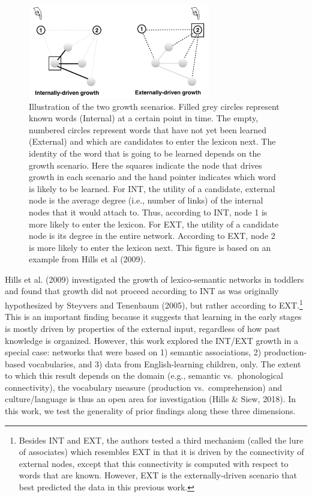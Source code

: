 \documentclass[english,floatsintext,man]{apa6}
\theoremstyle{definition}
\theoremstyle{definition}
\theoremstyle{definition}
\theoremstyle{remark}
\begin{document}
\begin{figure}

{\centering \includegraphics[width=300px]{figs/growth3} 

}

\caption{Illustration of the two growth scenarios. Filled grey circles represent known words (Internal) at a certain point in time. The empty, numbered circles represent words that have not yet been learned (External) and which are candidates to enter the lexicon next. The identity of the word that is going to be learned depends on the growth scenario.  Here the squares indicate the node that drives growth in each scenario and the hand pointer indicates which word is likely to be learned. For INT, the utility of a candidate, external node is the average degree (i.e., number of links) of the internal nodes that it would attach to. Thus, according to INT, node 1 is more likely to enter the lexicon. For EXT, the utility of a candidate node is its degree in the entire network. According to EXT, node 2 is more likely to enter the lexicon next. This figure is based on an example from Hills et al (2009).}\label{fig:growth}
\end{figure}

Hills et al. (2009) investigated the growth of lexico-semantic networks
in toddlers and found that growth did not proceed according to INT as
was originally hypothesized by Steyvers and Tenenbaum (2005), but rather
according to
EXT.\footnote{Besides INT and EXT, the authors tested a third mechanism (called the lure of associates) which resembles EXT in that it is driven by the connectivity of external nodes, except that this connectivity is computed with respect to words that are known. However, EXT is the externally-driven scenario that best predicted the data in this previous work.}
This is an important finding because it suggests that learning in the
early stages is mostly driven by properties of the external input,
regardless of how past knowledge is organized. However, this work
explored the INT/EXT growth in a special case: networks that were based
on 1) semantic associations, 2) production-based vocabularies, and 3)
data from English-learning children, only. The extent to which this
result depends on the domain (e.g., semantic vs.~phonological
connectivity), the vocabulary measure (production vs.~comprehension) and
culture/language is thus an open area for investigation (Hills \& Siew,
2018). In this work, we test the generality of prior findings along
these three dimensions.
\end{document}
